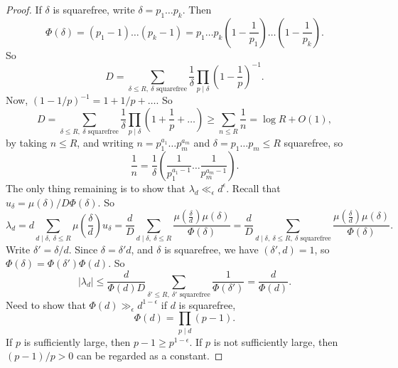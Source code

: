 \documentclass{article}
\newcommand{\rb}[1]{\left( #1 \right)}
\newcommand{\abs}[1]{\left\lvert #1 \right\rvert}
\theoremstyle{definition}\newtheorem{definition}{Definition}
\theoremstyle{definition}\newtheorem{remark}[definition]{Remark}
\theoremstyle{definition}\newtheorem*{example}{Example}
\theoremstyle{definition}\newtheorem*{note}{Note}
\begin{document}
\begin{proof}
If $ \delta $ is squarefree, write $ \delta = p_1 \dots p_k $. Then
$$ \Phi\rb{\delta} = \rb{p_1 - 1} \dots \rb{p_k - 1} = p_1 \dots p_k\rb{1 - \dfrac{1}{p_1}} \dots \rb{1 - \dfrac{1}{p_k}}. $$
So
$$ D = \sum_{\delta \le R, \ \delta \text{ squarefree}} \dfrac{1}{\delta}\prod_{p \mid \delta} \rb{1 - \dfrac{1}{p}}^{-1}. $$
Now, $ \rb{1 - 1 / p}^{-1} = 1 + 1 / p + \dots $. So
$$ D = \sum_{\delta \le R, \ \delta \text{ squarefree}} \dfrac{1}{\delta}\prod_{p \mid \delta} \rb{1 + \dfrac{1}{p} + \dots} \ge \sum_{n \le R} \dfrac{1}{n} = \log R + O\rb{1}, $$
by taking $ n \le R $, and writing $ n = p_1^{a_1} \dots p_m^{a_m} $ and $ \delta = p_1 \dots p_m \le R $ squarefree, so
$$ \dfrac{1}{n} = \dfrac{1}{\delta}\rb{\dfrac{1}{p_1^{a_1 - 1}} \dots \dfrac{1}{p_m^{a_m - 1}}}. $$
The only thing remaining is to show that $ \lambda_d \ll_\epsilon d^\epsilon $. Recall that $ u_\delta = \mu\rb{\delta} / D\Phi\rb{\delta} $. So
$$ \lambda_d = d\sum_{d \mid \delta, \ \delta \le R} \mu\rb{\dfrac{\delta}{d}}u_\delta = \dfrac{d}{D}\sum_{d \mid \delta, \ \delta \le R} \dfrac{\mu\rb{\tfrac{\delta}{d}}\mu\rb{\delta}}{\Phi\rb{\delta}} = \dfrac{d}{D}\sum_{d \mid \delta, \ \delta \le R, \ \delta \text{ squarefree}} \dfrac{\mu\rb{\tfrac{\delta}{d}}\mu\rb{\delta}}{\Phi\rb{\delta}}. $$
Write $ \delta' = \delta / d $. Since $ \delta = \delta'd $, and $ \delta $ is squarefree, we have $ \rb{\delta', d} = 1 $, so $ \Phi\rb{\delta} = \Phi\rb{\delta'}\Phi\rb{d} $. So
$$ \abs{\lambda_d} \le \dfrac{d}{\Phi\rb{d}D}\sum_{\delta' \le R, \ \delta' \text{ squarefree}} \dfrac{1}{\Phi\rb{\delta'}} = \dfrac{d}{\Phi\rb{d}}. $$
Need to show that $ \Phi\rb{d} \gg_\epsilon d^{1 - \epsilon} $ if $ d $ is squarefree,
$$ \Phi\rb{d} = \prod_{p \mid d} \rb{p - 1}. $$
If $ p $ is sufficiently large, then $ p - 1 \ge p^{1 - \epsilon} $. If $ p $ is not sufficiently large, then $ \rb{p - 1} / p > 0 $ can be regarded as a constant.
\end{proof}
\end{document}
